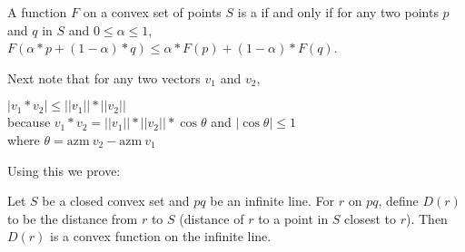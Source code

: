 \documentclass[12pt]{article}
\begin{document}
\begin{definition}
A function $F$ on a convex set of points $S$ is a 
if and only if
for any two points $p$ and $q$ in $S$ and
$0\le\alpha\le 1$,
$F(\alpha*p+(1-\alpha)*q)\le\alpha*F(p) + (1-\alpha)*F(q)$.
\end{definition}

Next note that for any two vectors $v_1$ and $v_2$,
\begin{center}
$|v_1*v_2|\le||v_1||*||v_2||$ \\
because $v_1*v_2 = ||v_1||*||v_2||*\cos\theta$ and $|\cos\theta|\le 1$ \\
where $\theta = \mathrm{azm}~v_2 - \mathrm{azm}~v_1$
\end{center}

Using this we prove:

\begin{lemma}
Let $S$ be a closed convex set and $pq$ be an infinite line.  For $r$ on $pq$,
define $D(r)$ to be the distance from $r$ to $S$ (distance of
$r$ to a point in $S$ closest to $r$).  Then $D(r)$ is a convex
function on the infinite line.
\end{lemma}
\end{document}
